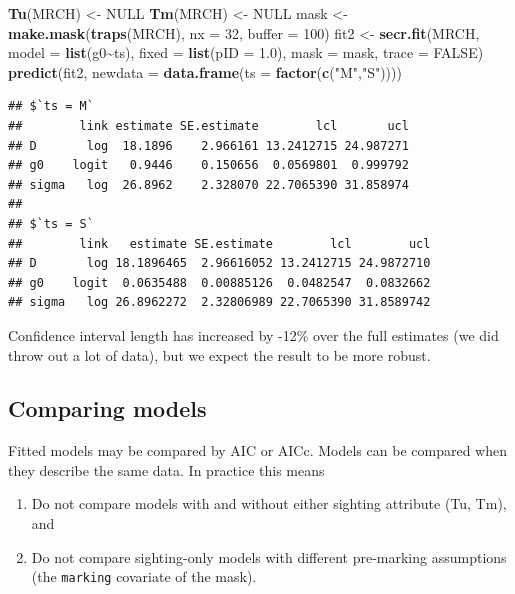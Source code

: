 \documentclass[
]{book}
\newenvironment{Shaded}{\begin{snugshade}}{\end{snugshade}}
\newcommand{\AttributeTok}[1]{\textcolor[rgb]{0.13,0.29,0.53}{#1}}
\newcommand{\ConstantTok}[1]{\textcolor[rgb]{0.56,0.35,0.01}{#1}}
\newcommand{\DecValTok}[1]{\textcolor[rgb]{0.00,0.00,0.81}{#1}}
\newcommand{\FloatTok}[1]{\textcolor[rgb]{0.00,0.00,0.81}{#1}}
\newcommand{\FunctionTok}[1]{\textcolor[rgb]{0.13,0.29,0.53}{\textbf{#1}}}
\newcommand{\NormalTok}[1]{#1}
\newcommand{\OtherTok}[1]{\textcolor[rgb]{0.56,0.35,0.01}{#1}}
\newcommand{\SpecialCharTok}[1]{\textcolor[rgb]{0.81,0.36,0.00}{\textbf{#1}}}
\newcommand{\StringTok}[1]{\textcolor[rgb]{0.31,0.60,0.02}{#1}}
\begin{document}
\begin{Shaded}
\begin{Highlighting}[]
\FunctionTok{Tu}\NormalTok{(MRCH) }\OtherTok{\textless{}{-}} \ConstantTok{NULL}
\FunctionTok{Tm}\NormalTok{(MRCH) }\OtherTok{\textless{}{-}} \ConstantTok{NULL}
\NormalTok{mask }\OtherTok{\textless{}{-}} \FunctionTok{make.mask}\NormalTok{(}\FunctionTok{traps}\NormalTok{(MRCH), }\AttributeTok{nx =} \DecValTok{32}\NormalTok{, }\AttributeTok{buffer =} \DecValTok{100}\NormalTok{)}
\NormalTok{fit2 }\OtherTok{\textless{}{-}} \FunctionTok{secr.fit}\NormalTok{(MRCH, }\AttributeTok{model =} \FunctionTok{list}\NormalTok{(g0}\SpecialCharTok{\textasciitilde{}}\NormalTok{ts), }\AttributeTok{fixed =} \FunctionTok{list}\NormalTok{(}\AttributeTok{pID =} \FloatTok{1.0}\NormalTok{), }\AttributeTok{mask =}\NormalTok{ mask, }
  \AttributeTok{trace =} \ConstantTok{FALSE}\NormalTok{)}
\FunctionTok{predict}\NormalTok{(fit2, }\AttributeTok{newdata =} \FunctionTok{data.frame}\NormalTok{(}\AttributeTok{ts =} \FunctionTok{factor}\NormalTok{(}\FunctionTok{c}\NormalTok{(}\StringTok{"M"}\NormalTok{,}\StringTok{"S"}\NormalTok{))))}
\end{Highlighting}
\end{Shaded}

\begin{verbatim}
## $`ts = M`
##        link estimate SE.estimate        lcl       ucl
## D       log  18.1896    2.966161 13.2412715 24.987271
## g0    logit   0.9446    0.150656  0.0569801  0.999792
## sigma   log  26.8962    2.328070 22.7065390 31.858974
## 
## $`ts = S`
##        link   estimate SE.estimate        lcl        ucl
## D       log 18.1896465  2.96616052 13.2412715 24.9872710
## g0    logit  0.0635488  0.00885126  0.0482547  0.0832662
## sigma   log 26.8962272  2.32806989 22.7065390 31.8589742
\end{verbatim}

Confidence interval length has increased by -12\% over the full estimates (we did throw out a lot of data), but we expect the result to be more robust.

\subsection{Comparing models}\label{comparing-models}

Fitted models may be compared by AIC or AICc. Models can be compared when they describe the same data. In practice this means

\begin{enumerate}
\def\labelenumi{\arabic{enumi}.}
\item
  Do not compare models with and without either sighting attribute (Tu, Tm), and
\item
  Do not compare sighting-only models with different pre-marking assumptions (the \texttt{marking} covariate of the mask).
\end{enumerate}
\end{document}
